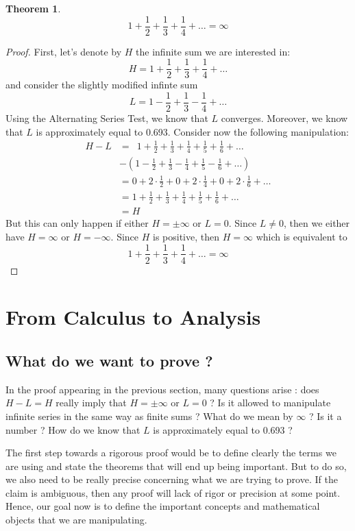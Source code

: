 \documentclass[12pt]{article}
\theoremstyle{definition}
\newtheorem*{theorem}{Theorem}
\begin{document}
\begin{theorem}
    $$ 1 + \frac{1}{2} + \frac{1}{3} + \frac{1}{4} + \dots = \infty$$
\end{theorem}

\begin{proof}
    First, let's denote by $H$ the infinite sum we are interested in:
    $$H = 1 + \frac{1}{2} + \frac{1}{3} + \frac{1}{4} + \dots$$
    and consider the slightly modified infinte sum
    $$L = 1 - \frac{1}{2} + \frac{1}{3} - \frac{1}{4} + \dots$$
    Using the Alternating Series Test, we know that $L$ converges. Moreover, we know that $L$ is approximately equal to 0.693. Consider now the following manipulation:
    \begin{align*}
        H - L &= \ \; 1 + \frac{1}{2} + \frac{1}{3} + \frac{1}{4} + \frac{1}{5} + \frac{1}{6} +\dots \\
        & - \left(1 - \frac{1}{2} + \frac{1}{3} - \frac{1}{4} + \frac{1}{5} - \frac{1}{6} +\dots\right) \\
        &= 0 + 2\cdot \frac{1}{2} + 0 + 2\cdot \frac{1}{4} + 0 + 2\cdot \frac{1}{6} + \dots \\
        &= 1 + \frac{1}{2} + \frac{1}{3} + \frac{1}{4} + \frac{1}{5} + \frac{1}{6} + \dots \\
        &= H
    \end{align*}
    But this can only happen if either $H = \pm \infty$ or $L = 0$. Since $L \neq 0$, then we either have $H = \infty$ or $H = -\infty$. Since $H$ is positive, then $H = \infty$ which is equivalent to
    $$ 1 + \frac{1}{2} + \frac{1}{3} + \frac{1}{4} + \dots = \infty$$
\end{proof}

\section{From Calculus to Analysis}

\subsection{What do we want to prove ?}

In the proof appearing in the previous section, many questions arise : does $H - L = H$ really imply that $H = \pm \infty$ or $L = 0$ ? Is it allowed to manipulate infinite series in the same way as finite sums ? What do we mean by $\infty$ ? Is it a number ? How do we know that $L$ is approximately equal to 0.693 ? 

The first step towards a rigorous proof would be to define clearly the terms we are using and state the theorems that will end up being important. But to do so, we also need to be really precise concerning what we are trying to prove. If the claim is ambiguous, then any proof will lack of rigor or precision at some point. Hence, our goal now is to define the important concepts and mathematical objects that we are manipulating.
\end{document}
